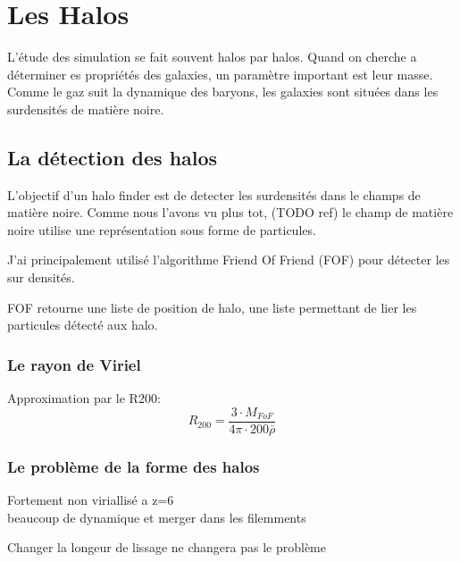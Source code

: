 \chapter{Les Halos}

L'étude des simulation se fait souvent halos par halos.
Quand on cherche a déterminer es propriétés des galaxies, un paramètre important est leur masse.
Comme le gaz suit la dynamique des baryons, les galaxies sont situées dans les surdensités de matière noire.




\section{La détection des halos}

L'objectif d'un halo finder est de detecter les surdensités dans le champs de matière noire.
Comme nous l'avons vu plus tot, (TODO ref) le champ de matière noire utilise une représentation sous forme de particules.

J'ai principalement utilisé l’algorithme Friend Of Friend (FOF) pour détecter les sur densités.

FOF retourne une liste de position de halo, une liste permettant de lier les particules détecté aux halo.

\subsection{Le rayon de Viriel}
Approximation par le R200:
\begin{equation}
R_{200}=\frac{3\cdot M_{FoF} }{4\pi\cdot 200 \bar{\rho} }
\end{equation}


\subsection{Le problème de la forme des halos}
Fortement non viriallisé a z=6\\
beaucoup de dynamique et merger dans les filemments

Changer la longeur de lissage ne changera pas le problème 

